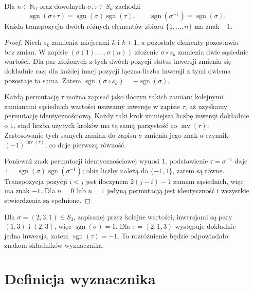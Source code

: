\begin{stwierdzenie}
\label{prop:lin6-znak-zlozenia}
Dla \(n\in\mathbb N_0\) oraz dowolnych
\(\sigma,\tau\in S_n\) zachodzi
\[
 \operatorname{sgn}(\sigma\circ\tau)
 =\operatorname{sgn}(\sigma)
  \operatorname{sgn}(\tau),\qquad
 \operatorname{sgn}(\sigma^{-1})
 =\operatorname{sgn}(\sigma).
\]
Każda transpozycja dwóch różnych
elementów zbioru \(\{1,\ldots,n\}\)
ma znak \(-1\).
\end{stwierdzenie}
\begin{proof}
Niech \(s_k\) zamienia miejscami
\(k\) i \(k+1\), a pozostałe elementy
pozostawia bez zmian. W zapisie
\((\sigma(1),\ldots,\sigma(n))\)
złożenie \(\sigma\circ s_k\)
zamienia dwie sąsiednie wartości.
Dla par złożonych z tych dwóch pozycji
status inwersji zmienia się dokładnie raz;
dla każdej innej pozycji łączna liczba
inwersji z tymi dwiema pozostaje ta sama.
Zatem
\(\operatorname{sgn}(\sigma\circ s_k)
=-\operatorname{sgn}(\sigma)\).

Każdą permutację \(\tau\) można zapisać
jako iloczyn takich zamian: kolejnymi
zamianami sąsiednich wartości usuwamy
inwersje w zapisie \(\tau\), aż uzyskamy
permutację identycznościową. Każdy taki krok
zmniejsza liczbę inwersji dokładnie o \(1\),
stąd liczba użytych kroków ma tę samą
parzystość co \(\operatorname{inv}(\tau)\).
Zastosowanie tych samych zamian do
zapisu \(\sigma\) zmienia jego znak
o czynnik \((-1)^{\operatorname{inv}(\tau)}\),
co daje pierwszą równość.

Ponieważ znak permutacji identycznościowej
wynosi \(1\), podstawienie
\(\tau=\sigma^{-1}\) daje
\(1=\operatorname{sgn}(\sigma)
\operatorname{sgn}(\sigma^{-1})\);
obie liczby należą do \(\{-1,1\}\),
zatem są równe.
Transpozycja pozycji \(i<j\) jest
iloczynem \(2(j-i)-1\) zamian sąsiednich,
więc ma znak \(-1\).
Dla \(n=0\) lub \(n=1\) jedyną
permutacją jest identyczność i
wszystkie stwierdzenia są spełnione.
\end{proof}

\begin{przyklad}
\label{prz:lin6-znaki}
Dla \(\sigma=(2,3,1)\in S_3\),
zapisanej przez kolejne wartości,
inwersjami są pary \((1,3)\) i \((2,3)\),
więc \(\operatorname{sgn}(\sigma)=1\).
Dla \(\tau=(2,1,3)\) występuje
dokładnie jedna inwersja, zatem
\(\operatorname{sgn}(\tau)=-1\).
To rozróżnienie będzie odpowiadało
znakom składników wyznacznika.
\end{przyklad}

\section{Definicja wyznacznika}
\label{sec:lin6-definicja}

